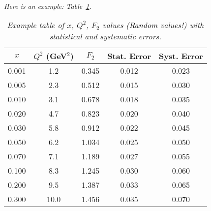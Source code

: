 \noindent\textit{Here is an example: Table~\ref{Table1}.}

\begin{table}[h]
    \centering
    \begin{tabular}{ccccc}
        \toprule
        $x$ & $Q^{2}$ (GeV$^{2}$) & $F_{2}$ & Stat. Error & Syst. Error \\
        \midrule
        0.001 & 1.2 & 0.345 & 0.012 & 0.023 \\
        0.005 & 2.3 & 0.512 & 0.015 & 0.030 \\
        0.010 & 3.1 & 0.678 & 0.018 & 0.035 \\
        0.020 & 4.7 & 0.823 & 0.020 & 0.040 \\
        0.030 & 5.8 & 0.912 & 0.022 & 0.045 \\
        0.050 & 6.2 & 1.034 & 0.025 & 0.050 \\
        0.070 & 7.1 & 1.189 & 0.027 & 0.055 \\
        0.100 & 8.3 & 1.245 & 0.030 & 0.060 \\
        0.200 & 9.5 & 1.387 & 0.033 & 0.065 \\
        0.300 & 10.0 & 1.456 & 0.035 & 0.070 \\
        \bottomrule
    \end{tabular}
    \caption[Text for Table 1]{\it Example table of $x$, $Q^{2}$, $F_{2}$ values (Random values!) with statistical and systematic errors.}
    \label{Table1}
\end{table}
